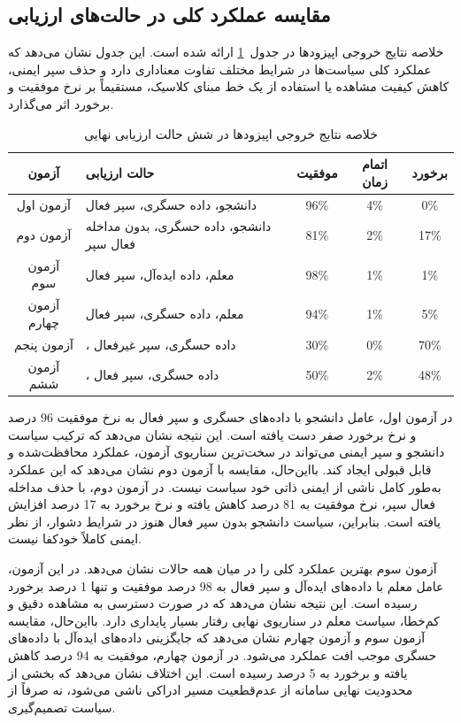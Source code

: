 \subsection{مقایسه عملکرد کلی در حالت‌های ارزیابی}
\label{subsec:final_eval_overall_comparison}

خلاصه نتایج خروجی اپیزودها در جدول~\ref{tab:final_eval_outcome_summary} ارائه شده است. این جدول نشان می‌دهد که عملکرد کلی سیاست‌ها در شرایط مختلف تفاوت معناداری دارد و حذف سپر ایمنی، کاهش کیفیت مشاهده یا استفاده از یک خط مبنای کلاسیک، مستقیماً بر نرخ موفقیت و برخورد اثر می‌گذارد.

\begin{table}[htbp]
	\centering
	\caption{خلاصه نتایج خروجی اپیزودها در شش حالت ارزیابی نهایی}
	\label{tab:final_eval_outcome_summary}
	\small
	\begin{tabular}{c p{6.8cm} c c c}
		\hline
		آزمون & حالت ارزیابی & موفقیت & اتمام زمان & برخورد \\
		\hline
		آزمون اول & دانشجو، داده حسگری، سپر فعال & 96\% & 4\% & 0\% \\
		آزمون دوم & دانشجو، داده حسگری، بدون مداخله فعال سپر & 81\% & 2\% & 17\% \\
		آزمون سوم & معلم، داده ایده‌آل، سپر فعال & 98\% & 1\% & 1\% \\
		آزمون چهارم & معلم، داده حسگری، سپر فعال & 94\% & 1\% & 5\% \\
		آزمون پنجم & \lr{MPC}، داده حسگری، سپر غیرفعال & 30\% & 0\% & 70\% \\
		آزمون ششم & \lr{MPC}، داده حسگری، سپر فعال & 50\% & 2\% & 48\% \\
		\hline
	\end{tabular}
\end{table}

در آزمون اول، عامل دانشجو با داده‌های حسگری و سپر فعال به نرخ موفقیت 96 درصد و نرخ برخورد صفر دست یافته است. این نتیجه نشان می‌دهد که ترکیب سیاست دانشجو و سپر ایمنی می‌تواند در سخت‌ترین سناریوی آزمون، عملکرد محافظت‌شده و قابل قبولی ایجاد کند. بااین‌حال، مقایسه با آزمون دوم نشان می‌دهد که این عملکرد به‌طور کامل ناشی از ایمنی ذاتی خود سیاست نیست. در آزمون دوم، با حذف مداخله فعال سپر، نرخ موفقیت به 81 درصد کاهش یافته و نرخ برخورد به 17 درصد افزایش یافته است. بنابراین، سیاست دانشجو بدون سپر فعال هنوز در شرایط دشوار، از نظر ایمنی کاملاً خودکفا نیست.

آزمون سوم بهترین عملکرد کلی را در میان همه حالات نشان می‌دهد. در این آزمون، عامل معلم با داده‌های ایده‌آل و سپر فعال به 98 درصد موفقیت و تنها 1 درصد برخورد رسیده است. این نتیجه نشان می‌دهد که در صورت دسترسی به مشاهده دقیق و کم‌خطا، سیاست معلم در سناریوی نهایی رفتار بسیار پایداری دارد. بااین‌حال، مقایسه آزمون سوم و آزمون چهارم نشان می‌دهد که جایگزینی داده‌های ایده‌آل با داده‌های حسگری موجب افت عملکرد می‌شود. در آزمون چهارم، موفقیت به 94 درصد کاهش یافته و برخورد به 5 درصد رسیده است. این اختلاف نشان می‌دهد که بخشی از محدودیت نهایی سامانه از عدم‌قطعیت مسیر ادراکی ناشی می‌شود، نه صرفاً از سیاست تصمیم‌گیری.


